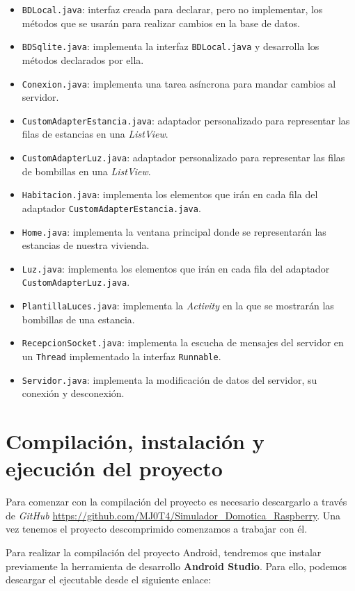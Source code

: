 \begin{itemize}
	\item \verb|BDLocal.java|: interfaz creada para declarar, pero no implementar, los métodos que se usarán para realizar cambios en la base de datos.
	\item \verb|BDSqlite.java|: implementa la interfaz \verb|BDLocal.java| y desarrolla los métodos declarados por ella.
	\item \verb|Conexion.java|: implementa una tarea asíncrona para mandar cambios al servidor.
	\item \verb|CustomAdapterEstancia.java|: adaptador personalizado para representar las filas de estancias en una \textit{ListView}.
	\item \verb|CustomAdapterLuz.java|: adaptador personalizado para representar las filas de bombillas en una \textit{ListView}.
	\item \verb|Habitacion.java|: implementa los elementos que irán en cada fila del adaptador \verb|CustomAdapterEstancia.java|.
	\item \verb|Home.java|: implementa la ventana principal donde se representarán las estancias de nuestra vivienda.
	\item \verb|Luz.java|: implementa los elementos que irán en cada fila del adaptador \verb|CustomAdapterLuz.java|.
	\item \verb|PlantillaLuces.java|: implementa la \textit{Activity} en la que se mostrarán las bombillas de una estancia.
	\item \verb|RecepcionSocket.java|: implementa la escucha de mensajes del servidor en un \verb|Thread| implementado la interfaz \verb|Runnable|.
	\item \verb|Servidor.java|: implementa la modificación de datos del servidor, su conexión y desconexión.
\end{itemize}

\section{Compilación, instalación y ejecución del proyecto}

Para comenzar con la compilación del proyecto es necesario descargarlo a través de \textit{GitHub} \url{https://github.com/MJ0T4/Simulador_Domotica_Raspberry}. Una vez tenemos el proyecto descomprimido comenzamos a trabajar con él.

Para realizar la compilación del proyecto Android, tendremos que instalar previamente la herramienta de desarrollo \textbf{Android Studio}. Para ello, podemos descargar el ejecutable desde el siguiente enlace:

